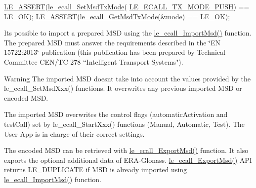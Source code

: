 \begin{DoxyCodeInclude}
    \hyperlink{le__log_8h_ac0dbbef91dc0fed449d0092ff0557b39}{LE\_ASSERT}(\hyperlink{le__ecall__interface_8h_a00d3dbc99884375cf2487d6640767c40}{le\_ecall\_SetMsdTxMode}(
      \hyperlink{le__ecall__interface_8h_adbaa600a7ab66371afddb909b1a113bdafe1cddc2df801a67c7f02020c0dd1127}{LE\_ECALL\_TX\_MODE\_PUSH}) == LE\_OK);
    \hyperlink{le__log_8h_ac0dbbef91dc0fed449d0092ff0557b39}{LE\_ASSERT}(\hyperlink{le__ecall__interface_8h_a4319df67dc451fecb72e4e60ba7b6f6e}{le\_ecall\_GetMsdTxMode}(&mode) == LE\_OK);
\end{DoxyCodeInclude}
 It\textquotesingle{}s possible to import a prepared M\+SD using the \hyperlink{le__ecall__interface_8h_a7d8d8c1e1f49af2f6145836975d20aeb}{le\+\_\+ecall\+\_\+\+Import\+Msd()} function. The prepared M\+SD must answer the requirements described in the \char`\"{}\+E\+N 15722\+:2013\char`\"{} publication (this publication has been prepared by Technical Committee C\+E\+N/\+TC 278 “\+Intelligent Transport Systems").

\begin{DoxyWarning}{Warning}
The imported M\+SD doesn\textquotesingle{}t take into account the values provided by the le\+\_\+ecall\+\_\+\+Set\+Msd\+Xxx() functions. It overwrites any previous imported M\+SD or encoded M\+SD.

The imported M\+SD overwrites the control flags (automatic\+Activation and test\+Call) set by le\+\_\+ecall\+\_\+\+Start\+Xxx() functions (Manual, Automatic, Test). The User App is in charge of their correct settings.
\end{DoxyWarning}
The encoded M\+SD can be retrieved with \hyperlink{le__ecall__interface_8h_adc9610dae7a6ba87c064f8dd271a57b4}{le\+\_\+ecall\+\_\+\+Export\+Msd()} function. It also exports the optional additional data of E\+R\+A-\/\+Glonass. \hyperlink{le__ecall__interface_8h_adc9610dae7a6ba87c064f8dd271a57b4}{le\+\_\+ecall\+\_\+\+Export\+Msd()} A\+PI returns L\+E\+\_\+\+D\+U\+P\+L\+I\+C\+A\+TE if M\+SD is already imported using \hyperlink{le__ecall__interface_8h_a7d8d8c1e1f49af2f6145836975d20aeb}{le\+\_\+ecall\+\_\+\+Import\+Msd()} function.


